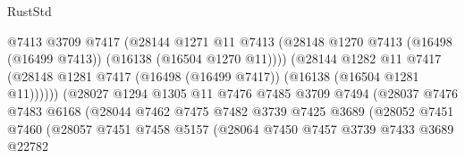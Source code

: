 \begin{lexlean}{RustStd}
\begin{coremodule}
                                      @7413
                                      @3709
                                      @7417
                                      (@28144
                                        @1271
                                        @11
                                        @7413
                                        (@28148
                                          @1270
                                          @7413
                                          (@16498 (@16499 @7413))
                                          (@16138 (@16504 @1270 @11))))
                                      (@28144
                                        @1282
                                        @11
                                        @7417
                                        (@28148
                                          @1281
                                          @7417
                                          (@16498 (@16499 @7417))
                                          (@16138 (@16504 @1281 @11))))))
                                  (@28027
                                    @1294
                                    @1305
                                    @11
                                    @7476
                                    @7485
                                    @3709
                                    @7494
                                    (@28037
                                      @7476
                                      @7483
                                      @6168
                                      (@28044
                                        @7462
                                        @7475
                                        @7482
                                        @3739
                                        @7425
                                        @3689
                                        (@28052
                                          @7451
                                          @7460
                                          (@28057
                                            @7451
                                            @7458
                                            @5157
                                            (@28064
                                              @7450
                                              @7457
                                              @3739
                                              @7433
                                              @3689
                                              @22782

\end{coremodule}
\end{lexlean}
